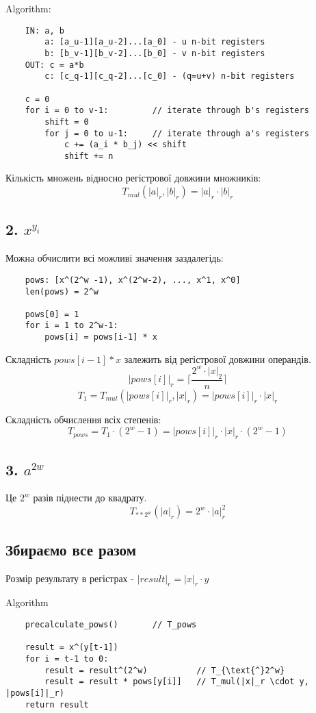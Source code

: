 \documentclass[11pt, a4paper]{article} %
\begin{document}
Algorithm:
\begin{lstlisting}
    IN: a, b
        a: [a_u-1][a_u-2]...[a_0] - u n-bit registers
        b: [b_v-1][b_v-2]...[b_0] - v n-bit registers
    OUT: c = a*b
        c: [c_q-1][c_q-2]...[c_0] - (q=u+v) n-bit registers

    c = 0
    for i = 0 to v-1:         // iterate through b's registers 
        shift = 0
        for j = 0 to u-1:     // iterate through a's registers 
            c += (a_i * b_j) << shift  
            shift += n
\end{lstlisting}

Кількість множень відносно регістрової довжини множників:
$$T_{mul}(|a|_r,|b|_r) = |a|_r \cdot |b|_r$$

\subsection*{2. $x^{y_i}$}
Можна обчислити всі можливі значення заздалегідь:

\begin{lstlisting}
    pows: [x^(2^w -1), x^(2^w-2), ..., x^1, x^0]
    len(pows) = 2^w

    pows[0] = 1
    for i = 1 to 2^w-1:
        pows[i] = pows[i-1] * x
\end{lstlisting}

Складність $pows[i-1] * x$ залежить від регістрової довжини операндів.
$$|pows[i]|_r = \lceil\frac{2^w \cdot |x|_2}{n}\rceil$$
$$T_1 = T_{mul}(|pows[i]|_r, |x|_r) = |pows[i]|_r \cdot |x|_r$$

Складність обчислення всіх степенів:
$$T_{pows} = T_1 \cdot (2^w-1) = |pows[i]|_r \cdot |x|_r \cdot (2^w-1)$$

\subsection*{3. $a^{2w}$}
Це $2^w$ разів піднести до квадрату.
$$T_{**2^w}(|a|_r) = 2^w \cdot |a|_r^2$$

\subsection*{Збираємо все разом}

Розмір результату в регістрах - $|result|_r = |x|_r \cdot y$

Algorithm
\begin{lstlisting}
    precalculate_pows()       // T_pows

    result = x^(y[t-1])
    for i = t-1 to 0:
        result = result^(2^w)          // T_{\text{^}2^w}
        result = result * pows[y[i]]   // T_mul(|x|_r \cdot y, |pows[i]|_r)
    return result
\end{lstlisting}
\end{document}
